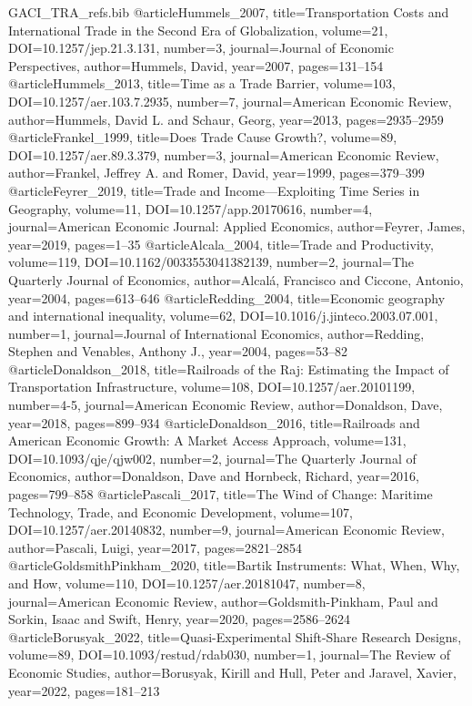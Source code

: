 \begin{filecontents*}[overwrite]{GACI_TRA_refs.bib}
@article{Hummels_2007, title={Transportation Costs and International Trade in the Second Era of Globalization}, volume={21}, DOI={10.1257/jep.21.3.131}, number={3}, journal={Journal of Economic Perspectives}, author={Hummels, David}, year={2007}, pages={131--154} }
@article{Hummels_2013, title={Time as a Trade Barrier}, volume={103}, DOI={10.1257/aer.103.7.2935}, number={7}, journal={American Economic Review}, author={Hummels, David L. and Schaur, Georg}, year={2013}, pages={2935--2959} }
@article{Frankel_1999, title={Does Trade Cause Growth?}, volume={89}, DOI={10.1257/aer.89.3.379}, number={3}, journal={American Economic Review}, author={Frankel, Jeffrey A. and Romer, David}, year={1999}, pages={379--399} }
@article{Feyrer_2019, title={Trade and Income---Exploiting Time Series in Geography}, volume={11}, DOI={10.1257/app.20170616}, number={4}, journal={American Economic Journal: Applied Economics}, author={Feyrer, James}, year={2019}, pages={1--35} }
@article{Alcala_2004, title={Trade and Productivity}, volume={119}, DOI={10.1162/0033553041382139}, number={2}, journal={The Quarterly Journal of Economics}, author={Alcal\'a, Francisco and Ciccone, Antonio}, year={2004}, pages={613--646} }
@article{Redding_2004, title={Economic geography and international inequality}, volume={62}, DOI={10.1016/j.jinteco.2003.07.001}, number={1}, journal={Journal of International Economics}, author={Redding, Stephen and Venables, Anthony J.}, year={2004}, pages={53--82} }
@article{Donaldson_2018, title={Railroads of the Raj: Estimating the Impact of Transportation Infrastructure}, volume={108}, DOI={10.1257/aer.20101199}, number={4-5}, journal={American Economic Review}, author={Donaldson, Dave}, year={2018}, pages={899--934} }
@article{Donaldson_2016, title={Railroads and American Economic Growth: A Market Access Approach}, volume={131}, DOI={10.1093/qje/qjw002}, number={2}, journal={The Quarterly Journal of Economics}, author={Donaldson, Dave and Hornbeck, Richard}, year={2016}, pages={799--858} }
@article{Pascali_2017, title={The Wind of Change: Maritime Technology, Trade, and Economic Development}, volume={107}, DOI={10.1257/aer.20140832}, number={9}, journal={American Economic Review}, author={Pascali, Luigi}, year={2017}, pages={2821--2854} }
@article{GoldsmithPinkham_2020, title={Bartik Instruments: What, When, Why, and How}, volume={110}, DOI={10.1257/aer.20181047}, number={8}, journal={American Economic Review}, author={Goldsmith-Pinkham, Paul and Sorkin, Isaac and Swift, Henry}, year={2020}, pages={2586--2624} }
@article{Borusyak_2022, title={Quasi-Experimental Shift-Share Research Designs}, volume={89}, DOI={10.1093/restud/rdab030}, number={1}, journal={The Review of Economic Studies}, author={Borusyak, Kirill and Hull, Peter and Jaravel, Xavier}, year={2022}, pages={181--213} }

\end{filecontents*}
